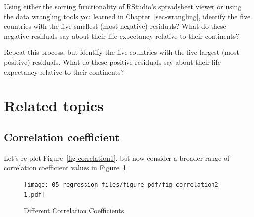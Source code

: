 \documentclass[
  letterpaper,
  DIV=11,
  numbers=noendperiod]{scrreprt}
\theoremstyle{definition}
\theoremstyle{remark}
\begin{document}
\begin{tcolorbox}[enhanced jigsaw, colback=white, toprule=.15mm, bottomrule=.15mm, titlerule=0mm, title={{🎯} Learning Check 5.5}, leftrule=.75mm, arc=.35mm, left=2mm, colframe=quarto-callout-tip-color-frame, coltitle=black, opacitybacktitle=0.6, bottomtitle=1mm, colbacktitle=quarto-callout-tip-color!10!white, opacityback=0, toptitle=1mm, rightrule=.15mm, breakable]

Using either the sorting functionality of RStudio's spreadsheet viewer
or using the data wrangling tools you learned in
Chapter~\ref{sec-wrangling}, identify the five countries with the five
smallest (most negative) residuals? What do these negative residuals say
about their life expectancy relative to their continents?

\end{tcolorbox}

\begin{tcolorbox}[enhanced jigsaw, colback=white, toprule=.15mm, bottomrule=.15mm, titlerule=0mm, title={{🎯} Learning Check 5.6}, leftrule=.75mm, arc=.35mm, left=2mm, colframe=quarto-callout-tip-color-frame, coltitle=black, opacitybacktitle=0.6, bottomtitle=1mm, colbacktitle=quarto-callout-tip-color!10!white, opacityback=0, toptitle=1mm, rightrule=.15mm, breakable]

Repeat this process, but identify the five countries with the five
largest (most positive) residuals. What do these positive residuals say
about their life expectancy relative to their continents?

\end{tcolorbox}

\hypertarget{related-topics}{%
\section{Related topics}\label{related-topics}}

\hypertarget{sec-correlationcoefficient}{%
\subsection{Correlation coefficient}\label{sec-correlationcoefficient}}

Let's re-plot Figure~\ref{fig-correlation1}, but now consider a broader
range of correlation coefficient values in
Figure~\ref{fig-correlation2}.

\begin{figure}

{\centering \texttt{[image: 05-regression\_files/figure-pdf/fig-correlation2-1.pdf]}

}

\caption{\label{fig-correlation2}Different Correlation Coefficients}

\end{figure}
\end{document}

